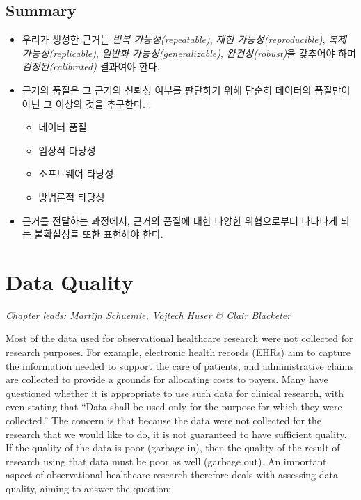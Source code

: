 \documentclass[11pt]{book}
\providecommand{\tightlist}{%
  \setlength{\itemsep}{0pt}\setlength{\parskip}{0pt}}
\theoremstyle{definition}
\theoremstyle{definition}
\theoremstyle{definition}
\theoremstyle{remark}
\let\BeginKnitrBlock\begin \let\EndKnitrBlock\end
\begin{document}
\section{Summary}\label{summary-8}

\BeginKnitrBlock{rmdsummary}
\begin{itemize}
\item
  우리가 생성한 근거는 \emph{반복 가능성(repeatable)}, \emph{재현
  가능성(reproducible)}, \emph{복제 가능성(replicable)}, \emph{일반화
  가능성(generalizable)}, \emph{완건성(robust)}을 갖추어야 하며
  \emph{검정된(calibrated)} 결과여야 한다.
\item
  근거의 품질은 그 근거의 신뢰성 여부를 판단하기 위해 단순히 데이터의
  품질만이 아닌 그 이상의 것을 추구한다. :

  \begin{itemize}
  \tightlist
  \item
    데이터 품질
  \item
    임상적 타당성
  \item
    소프트웨어 타당성
  \item
    방법론적 타당성
  \end{itemize}
\item
  근거를 전달하는 과정에서, 근거의 품질에 대한 다양한 위협으로부터
  나타나게 되는 불확실성들 또한 표현해야 한다.
\end{itemize}
\EndKnitrBlock{rmdsummary}

\chapter{Data Quality}\label{DataQuality}

\emph{Chapter leads: Martijn Schuemie, Vojtech Huser \& Clair Blacketer}

Most of the data used for observational healthcare research were not
collected for research purposes. For example, electronic health records
(EHRs) aim to capture the information needed to support the care of
patients, and administrative claims are collected to provide a grounds
for allocating costs to payers. Many have questioned whether it is
appropriate to use such data for clinical research, with
\citet{vanDerLei_1991} even stating that ``Data shall be used only for
the purpose for which they were collected.'' The concern is that because
the data were not collected for the research that we would like to do,
it is not guaranteed to have sufficient quality. If the quality of the
data is poor (garbage in), then the quality of the result of research
using that data must be poor as well (garbage out). An important aspect
of observational healthcare research therefore deals with assessing data
quality, aiming to answer the question:
\end{document}
